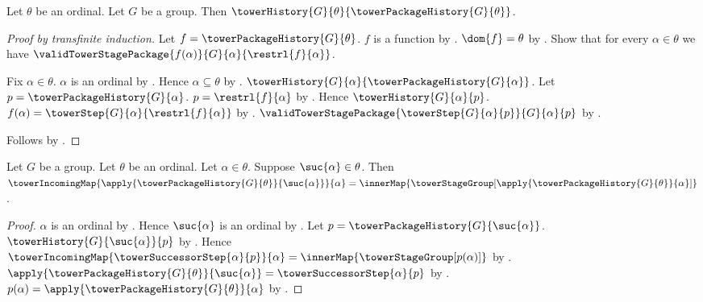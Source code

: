 \begin{theorem}\label{tower_package_history_is_history}
    Let $\theta$ be an ordinal.
    Let $G$ be a group.
    Then $\towerHistory{G}{\theta}{\towerPackageHistory{G}{\theta}}$.
\end{theorem}
\begin{proof}[Proof by transfinite induction]
    Let $f=\towerPackageHistory{G}{\theta}$.
    $f$ is a function by .
    $\dom{f}=\theta$ by .
    Show that for every $\alpha\in\theta$ we have
        $\validTowerStagePackage
            {f(\alpha)}{G}{\alpha}{\restrl{f}{\alpha}}$.
    \begin{subproof}
        Fix $\alpha\in\theta$.
        $\alpha$ is an ordinal by
            .
        Hence $\alpha\subseteq\theta$ by
            .
        $\towerHistory{G}{\alpha}{\towerPackageHistory{G}{\alpha}}$.
        Let $p=\towerPackageHistory{G}{\alpha}$.
        $p=\restrl{f}{\alpha}$ by
            .
        Hence $\towerHistory{G}{\alpha}{p}$.
        $f(\alpha)=\towerStep{G}{\alpha}{\restrl{f}{\alpha}}$ by
            .
        $\validTowerStagePackage
            {\towerStep{G}{\alpha}{p}}{G}{\alpha}{p}$ by
            .
    \end{subproof}
    Follows by .
\end{proof}

\begin{proposition}\label{tower_package_history_successor_bond}
    Let $G$ be a group.
    Let $\theta$ be an ordinal.
    Let $\alpha\in\theta$.
    Suppose $\suc{\alpha}\in\theta$.
    Then $\towerIncomingMap{
            \apply{\towerPackageHistory{G}{\theta}}{\suc{\alpha}}}
            {\alpha}=
        \innerMap{\towerStageGroup[
            \apply{\towerPackageHistory{G}{\theta}}{\alpha}]}$.
\end{proposition}
\begin{proof}
    $\alpha$ is an ordinal by
        .
    Hence $\suc{\alpha}$ is an ordinal by .
    Let $p=\towerPackageHistory{G}{\suc{\alpha}}$.
    $\towerHistory{G}{\suc{\alpha}}{p}$ by
        .
    Hence
        $\towerIncomingMap{\towerSuccessorStep{\alpha}{p}}{\alpha}=
            \innerMap{\towerStageGroup[p(\alpha)]}$ by
        .
    $\apply{\towerPackageHistory{G}{\theta}}{\suc{\alpha}}=
        \towerSuccessorStep{\alpha}{p}$ by
        .
    $p(\alpha)=\apply{\towerPackageHistory{G}{\theta}}{\alpha}$ by
        .
\end{proof}
